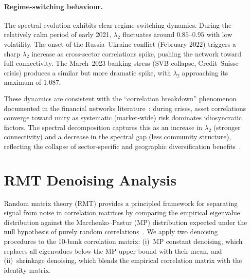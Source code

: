 \paragraph{Regime-switching behaviour.}
The spectral evolution exhibits clear regime-switching dynamics. During the relatively calm period of early 2021, $\lambda_2$ fluctuates around $0.85$--$0.95$ with low volatility. The onset of the Russia--Ukraine conflict (February 2022) triggers a sharp $\lambda_2$ increase as cross-sector correlations spike, pushing the network toward full connectivity. The March~2023 banking stress (SVB collapse, Credit~Suisse crisis) produces a similar but more dramatic spike, with $\lambda_2$ approaching its maximum of $1.087$.

These dynamics are consistent with the ``correlation breakdown'' phenomenon documented in the financial networks literature~\cite{mantegna1999introduction,bonanno2004networks}: during crises, asset correlations converge toward unity as systematic (market-wide) risk dominates idiosyncratic factors. The spectral decomposition captures this as an increase in $\lambda_2$ (stronger connectivity) and a decrease in the spectral gap (less community structure), reflecting the collapse of sector-specific and geographic diversification benefits~\cite{tumminello2005tool,laloux1999noise}.


\section{RMT Denoising Analysis}
\label{sec:rmt-denoising}

Random matrix theory (RMT) provides a principled framework for separating signal from noise in correlation matrices by comparing the empirical eigenvalue distribution against the Marchenko--Pastur (MP) distribution expected under the null hypothesis of purely random correlations~\cite{laloux1999noise}. We apply two denoising procedures to the 10-bank correlation matrix: (i)~MP constant denoising, which replaces all eigenvalues below the MP upper bound with their mean, and (ii)~shrinkage denoising, which blends the empirical correlation matrix with the identity matrix.

